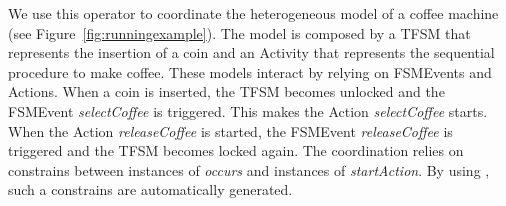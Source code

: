 We use this operator to coordinate the heterogeneous model of a coffee machine (see Figure~\ref{fig:runningexample}). The model is composed by a TFSM that represents the insertion of a coin and an Activity that represents the sequential procedure to make coffee. These models interact by relying on FSMEvents and Actions. When a coin is inserted, the TFSM becomes unlocked and the FSMEvent \emph{selectCoffee} is triggered. This makes the Action \emph{selectCoffee} starts. When the Action \emph{releaseCoffee} is started, the FSMEvent \emph{releaseCoffee} is triggered and the TFSM becomes locked again. The coordination relies on constrains between instances of \dse \emph{occurs} and instances of \dse \emph{startAction}. By using \bcool, such a constrains are automatically generated.  
